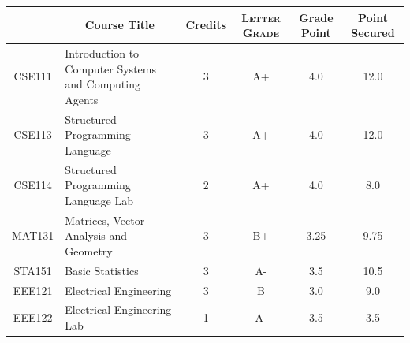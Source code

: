 \documentclass[11pt]{article}
\newcommand*{\numtwo}[1]{\pgfmathprintnumber[
                    fixed, precision=2, fixed zerofill=true]{#1}}
\begin{document}
                \begin{center}
                    \renewcommand{\arraystretch}{1.08}
                    
                \begin{tabular}{|c|l|c|>{\scshape}c|c|c|}
                \hline  \rule[-1ex]{0pt}{3.5ex} {\centering{\bf Course Code}} &  \multicolumn{1}{c|}{\textbf{Course Title}}  & {\bf Credits} & {\bf Letter Grade} & {\bf Grade Point} & {\bf Point Secured}  \\ 
                \hline   CSE111 &  Introduction to Computer Systems and Computing Agents		 & 3 & A+ & 4.0 & 12.0 \\ %
                \hline   CSE113 &  Structured Programming Language		 & 3 & A+ & 4.0 & 12.0 \\ %
                \hline   CSE114 &  Structured Programming Language Lab		 & 2 & A+ & 4.0 & 8.0 \\ %
                \hline   MAT131 &  Matrices, Vector Analysis and Geometry		 & 3 & B+ & 3.25 & 9.75 \\ %
                \hline   STA151 &  Basic Statistics		 & 3 & A- & 3.5 & 10.5 \\ %
                \hline   EEE121 &  Electrical Engineering		 & 3 & B & 3.0 & 9.0 \\ %
                \hline   EEE122 &  Electrical Engineering Lab		 & 1 & A- & 3.5 & 3.5 \\ %

\hline                %
                \end{tabular}
                \end{center}
                \renewcommand{\arraystretch}{1.03}
\end{document}
